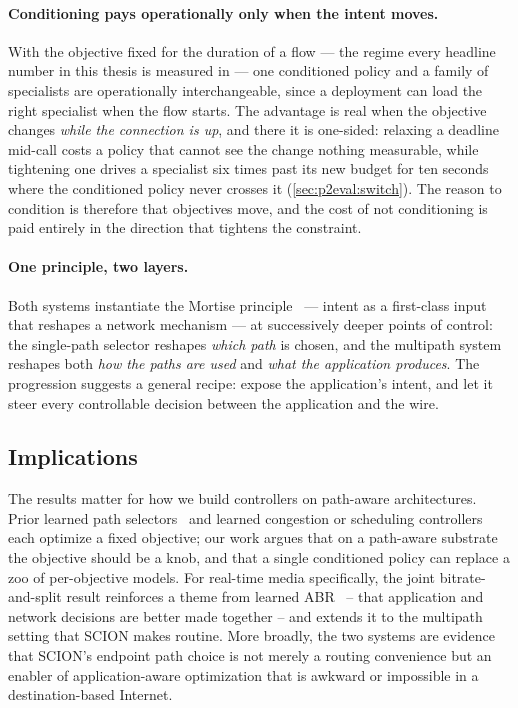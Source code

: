 \paragraph{Conditioning pays operationally only when the intent moves.} With the objective fixed for the
duration of a flow --- the regime every headline number in this thesis is measured in --- one
conditioned policy and a family of specialists are operationally interchangeable, since a deployment can
load the right specialist when the flow starts. The advantage is real when the objective changes
\emph{while the connection is up}, and there it is one-sided: relaxing a deadline mid-call costs a policy
that cannot see the change nothing measurable, while tightening one drives a specialist six times past
its new budget for ten seconds where the conditioned policy never crosses it
(\cref{sec:p2eval:switch}). The reason to condition is therefore that objectives move, and the cost of
not conditioning is paid entirely in the direction that tightens the constraint.

\paragraph{One principle, two layers.} Both systems instantiate the Mortise principle~\cite{Shen2026} ---
intent as a first-class input that reshapes a network mechanism --- at successively deeper points of
control: the single-path selector reshapes \emph{which path} is chosen, and the multipath system
reshapes both \emph{how the paths are used} and \emph{what the application produces}. The progression
suggests a general recipe: expose the application's intent, and let it steer every controllable decision
between the application and the wire.

\subsection{Implications}
\label{sec:disc:implications}

The results matter for how we build controllers on path-aware architectures. Prior learned path
selectors~\cite{Bourak2025} and learned congestion or scheduling controllers~\cite{Jay2019, Zhang2019,
Wu2020} each optimize a fixed objective; our work argues that on a path-aware substrate the objective should
be a knob, and that a single conditioned policy can replace a zoo of per-objective models. For real-time
media specifically, the joint bitrate-and-split result reinforces a theme from learned
ABR~\cite{Mao2017} -- that application and network decisions are better made together -- and extends it to
the multipath setting that SCION makes routine. More broadly, the two systems are evidence that SCION's
endpoint path choice is not merely a routing convenience but an enabler of application-aware optimization
that is awkward or impossible in a destination-based Internet.

